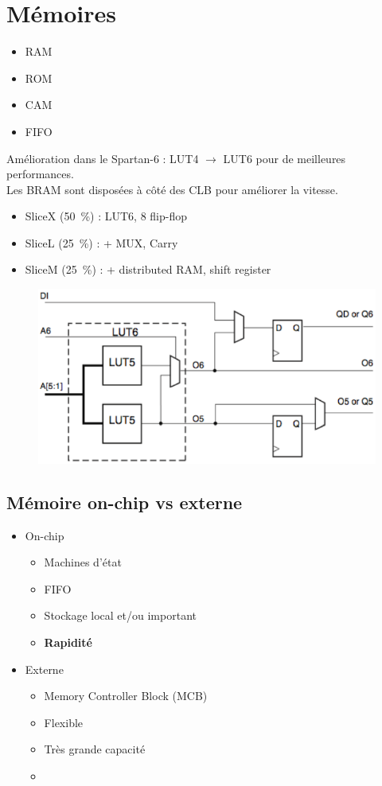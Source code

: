 \documentclass[resume]{subfiles}
\begin{document}
\section{Mémoires}
\begin{itemize}
\item RAM
\item ROM
\item CAM
\item FIFO
\end{itemize}
Amélioration dans le Spartan-6 : LUT4 $\rightarrow$ LUT6 pour de meilleures performances.\\
Les BRAM sont disposées à côté des CLB pour améliorer la vitesse.
\begin{itemize}
\item SliceX (\SI{50}{\percent}) : LUT6, 8 flip-flop
\item SliceL (\SI{25}{\percent}) : + MUX, Carry
\item SliceM (\SI{25}{\percent}) : + distributed RAM, shift register
\end{itemize}
\begin{figure}[H]
\centering
\includegraphics[width=\columnwidth]{img_0.png}
\end{figure}
\subsection{Mémoire on-chip vs externe}
\begin{itemize}
\item On-chip
\begin{itemize}
\item Machines d'état
\item FIFO
\item Stockage local et/ou important
\item \textbf{Rapidité}
\end{itemize}
\item Externe
\begin{itemize}
\item Memory Controller Block (MCB)
\item Flexible
\item Très grande capacité
\item 
\end{itemize}
\end{itemize}
\end{document}
